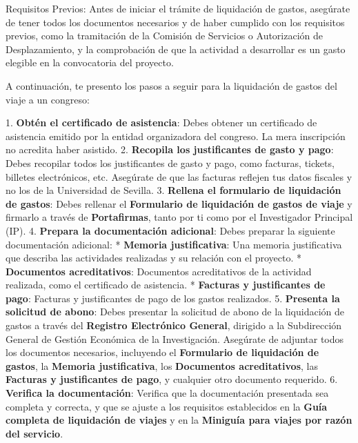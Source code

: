 \documentclass{article}
\begin{document}
\begin{itemize}
\begin{itemize}
                        Requisitos Previos:
                        Antes de iniciar el trámite de liquidación de gastos, asegúrate de tener todos los documentos necesarios y de haber cumplido con los requisitos previos, como la tramitación de la Comisión de Servicios o Autorización de Desplazamiento, y la comprobación de que la actividad a desarrollar es un gasto elegible en la convocatoria del proyecto.

                        A continuación, te presento los pasos a seguir para la liquidación de gastos del viaje a un congreso:

                        1. \textbf{Obtén el certificado de asistencia}: Debes obtener un certificado de asistencia emitido por la entidad organizadora del congreso. La mera inscripción no acredita haber asistido.
                        2. \textbf{Recopila los justificantes de gasto y pago}: Debes recopilar todos los justificantes de gasto y pago, como facturas, tickets, billetes electrónicos, etc. Asegúrate de que las facturas reflejen tus datos fiscales y no los de la Universidad de Sevilla.
                        3. \textbf{Rellena el formulario de liquidación de gastos}: Debes rellenar el \textbf{Formulario de liquidación de gastos de viaje} y firmarlo a través de \textbf{Portafirmas}, tanto por ti como por el Investigador Principal (IP).
                        4. \textbf{Prepara la documentación adicional}: Debes preparar la siguiente documentación adicional:
                        * \textbf{Memoria justificativa}: Una memoria justificativa que describa las actividades realizadas y su relación con el proyecto.
                        * \textbf{Documentos acreditativos}: Documentos acreditativos de la actividad realizada, como el certificado de asistencia.
                        * \textbf{Facturas y justificantes de pago}: Facturas y justificantes de pago de los gastos realizados.
                        5. \textbf{Presenta la solicitud de abono}: Debes presentar la solicitud de abono de la liquidación de gastos a través del \textbf{Registro Electrónico General}, dirigido a la Subdirección General de Gestión Económica de la Investigación. Asegúrate de adjuntar todos los documentos necesarios, incluyendo el \textbf{Formulario de liquidación de gastos}, la \textbf{Memoria justificativa}, los \textbf{Documentos acreditativos}, las \textbf{Facturas y justificantes de pago}, y cualquier otro documento requerido.
                        6. \textbf{Verifica la documentación}: Verifica que la documentación presentada sea completa y correcta, y que se ajuste a los requisitos establecidos en la \textbf{Guía completa de liquidación de viajes} y en la \textbf{Miniguía para viajes por razón del servicio}.


\end{itemize}
\end{itemize}
\end{document}
